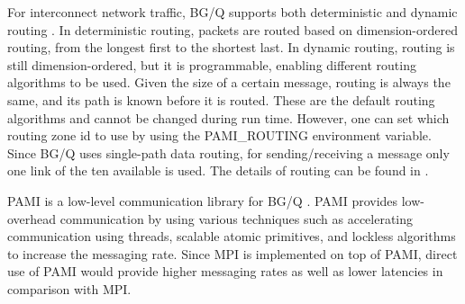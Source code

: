 For interconnect network traffic, BG/Q supports both deterministic and dynamic routing \cite{Chen:BGQ}. In deterministic routing, packets are routed based on dimension-ordered routing, from the longest first to the shortest last. In dynamic routing, routing is still dimension-ordered, but it is programmable, enabling different routing algorithms to be used. Given the size of a certain message, routing is always the same, and its path is known before it is routed. These are the default routing algorithms and cannot be changed during run time. However, one can set which routing zone id to use by using the PAMI\_ROUTING environment variable. Since BG/Q uses single-path data routing, for sending/receiving a message only one link of the ten available is used. The details of routing can be found in \cite{Chen:BGQ}.

PAMI is a low-level communication library for BG/Q \cite{PAMI:Kumar}. PAMI provides low-overhead communication by using various techniques such as accelerating communication using threads, scalable atomic primitives, and lockless algorithms to increase the messaging rate. Since MPI is implemented on top of PAMI, direct use of PAMI would provide higher messaging rates as well as lower latencies in comparison with MPI.


